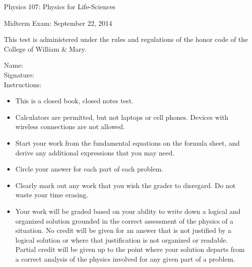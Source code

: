 \documentclass[letterpaper,addpoints,answers]{exam}
\begin{document}
\begin{coverpages}
 \large\bfseries
 
 \noindent 
 Physics 107: Physics for Life-Sciences

 \vspace{2ex}
 \noindent
 Midterm Exam: September 22, 2014

 \vspace{3ex}
 \noindent 
 This test is administered under the rules and regulations of the honor code of the College of William \& Mary.

 \vspace{2ex}
 \noindent 
 Name:\enspace\makebox[2.3in]{\hrulefill} \\

 \noindent 
 Signature:\enspace\makebox[2in]{\hrulefill} \\

 \vspace{5ex}
 \noindent 
 Instructions:
 \begin{itemize}
  \item This is a closed book, closed notes test.
  \item Calculators are permitted, but not laptops or cell phones. Devices with wireless connections are not allowed.
  \item Start your work from the fundamental equations on the formula sheet, and derive any additional expressions that you may need.
  \item Circle your answer for each part of each problem. 
  \item Clearly mark out any work that you wish the grader to disregard.  Do not waste your time erasing.
  \item Your work will be graded based on your ability to write down a logical and organized solution grounded in the correct assessment of the physics of a situation. No credit will be given for an answer that is not justified by a logical solution or where that justification is not organized or readable. Partial credit will be given up to the point where your solution departs from a correct analysis of the physics involved for any given part of a problem.
 \end{itemize}

 \pagebreak

 \begin{center}
  \gradetable[v][questions]
 \end{center}
 
\end{coverpages}
 
\end{document}
